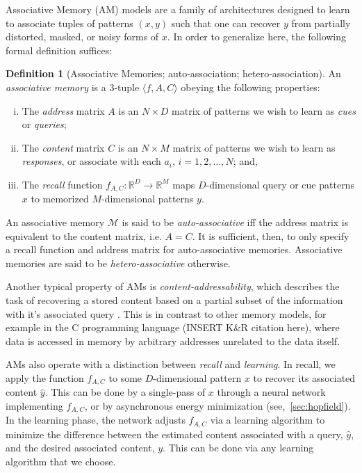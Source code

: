 \documentclass{article}
\theoremstyle{definition}
\newtheorem{definition}{Definition}[subsection]
\begin{document}
Associative Memory (AM) models are a family of architectures designed to
learn to associate tuples of patterns $(x, y)$ such that one can recover
$y$ from partially distorted, masked, or noisy forms of $x$. In order to
generalize here, the following formal definition suffices:
\begin{definition}[Associative Memories; auto-association;
  hetero-association]\label{def:assoc-memory}
  An \textit{associative memory} is a $3$-tuple $\langle f, A, C \rangle$
  obeying the following properties:
  \begin{enumerate}[(i)]
    \item The \textit{address} matrix $A$ is an $N \times D$ matrix of
      patterns we wish to learn as \textit{cues} or
      \textit{queries};\label{def:assoc:cond1}
    \item The \textit{content} matrix $C$ is an $N \times M$ matrix of
      patterns we wish to learn as \textit{responses}, or associate with
      each $a_i$, $i = 1, 2, \dots, N$; and, \label{def:assoc:cond2}
    \item The \textit{recall} function
      $f_{A, C} : \mathbb{R}^D \to \mathbb{R}^M$ maps $D$-dimensional query or
      cue patterns $x$ to memorized $M$-dimensional patterns $y$.
      \label{def:assoc:cond3}
  \end{enumerate}
  An associative memory $\mathcal{M}$ is said to be \textit{auto-associative}
  iff the address matrix is equivalent to the content matrix, i.e. $A=C$.
  It is sufficient, then, to only specify a recall function and
  address matrix for
  auto-associative memories.  Associative memories are said to be
  \textit{hetero-associative} otherwise.
\end{definition}
Another typical property of AMs is \textit{content-addressability}, which
describes the task of recovering a stored content based on a partial subset
of the information with it's associated query
\parencites{mcclelland_appeal_1986,haykin_neural_2009}. This is in contrast
to other memory models, for example in the C programming language
(INSERT K\&R citation here), where data
is accessed in memory by arbitrary addresses unrelated to the data itself.

AMs also operate with a distinction between
\textit{recall} and \textit{learning}. In recall, we apply the function
$f_{A,C}$ to some $D$-dimensional pattern $x$ to recover its associated
content $\hat y$. This can be done by a single-pass of $x$ through
a neural network implementing $f_{A,C}$, or by asynchronous energy minimization
(see,~\autoref{sec:hopfield}). In the learning phase, the network adjusts
$f_{A,C}$ via a learning algorithm to minimize the difference
between the estimated content associated with a query, $\hat y$, and the desired
associated content, $y$. This can be done via any learning algorithm that we
choose.
\end{document}
